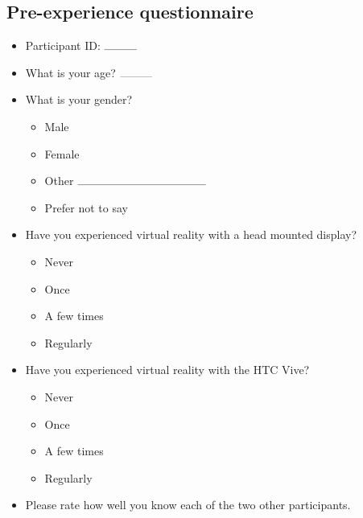 \documentclass[]{simple-thesis}
\begin{document}
\cleardoublepage
{}
{}




\begin{appendices}


\chapter{Pre-experience questionnaire}\label{appendix:questionnaire:pre}

\begin{itemize}

\item Participant ID: $\rule{1cm}{0.1mm}$

\item What is your age? $\rule{1cm}{0.1mm}$

\item What is your gender?

\begin{itemize}
  \item Male
  \item Female
  \item Other $\rule{4cm}{0.1mm}$
  \item Prefer not to say
\end{itemize}

\item Have you experienced virtual reality with a head mounted display?

\begin{itemize}
  \item Never
  \item Once
  \item A few times
  \item Regularly
\end{itemize}

\item Have you experienced virtual reality with the HTC Vive?

\begin{itemize}
  \item Never
  \item Once
  \item A few times
  \item Regularly
\end{itemize}

\item Please rate how well you know each of the two other participants.


\end{itemize}
\end{appendices}
\end{document}
